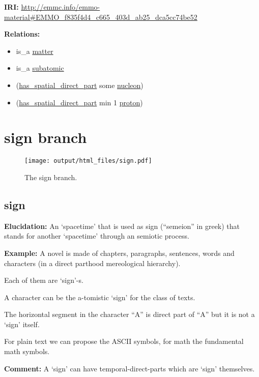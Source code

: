 \documentclass[a4paper,]{report}
\providecommand{\tightlist}{%
  \setlength{\itemsep}{0pt}\setlength{\parskip}{0pt}}
\begin{document}
\textbf{IRI:}
\url{http://emmc.info/emmo-material\#EMMO_f835f4d4_c665_403d_ab25_dca5cc74be52}

\textbf{Relations:}

\begin{itemize}
\tightlist
\item
  is\_a \protect\hyperlink{matter}{matter}
\item
  is\_a \protect\hyperlink{subatomic}{subatomic}
\item
  (\protect\hyperlink{has_spatial_direct_part}{has\_spatial\_direct\_part}
  some \protect\hyperlink{nucleon}{nucleon})
\item
  (\protect\hyperlink{has_spatial_direct_part}{has\_spatial\_direct\_part}
  min 1 \protect\hyperlink{proton}{proton})
\end{itemize}

\hypertarget{sign-branch}{%
\section{sign branch}\label{sign-branch}}

\begin{figure}
\centering
\texttt{[image: output/html\_files/sign.pdf]}
\caption{The sign branch.}
\end{figure}

\hypertarget{sign}{%
\subsection{sign}\label{sign}}

\textbf{Elucidation:} An `spacetime' that is used as sign (``semeion''
in greek) that stands for another `spacetime' through an semiotic
process.

\textbf{Example:} A novel is made of chapters, paragraphs, sentences,
words and characters (in a direct parthood mereological hierarchy).

Each of them are `sign'-s.

A character can be the a-tomistic `sign' for the class of texts.

The horizontal segment in the character ``A'' is direct part of ``A''
but it is not a `sign' itself.

For plain text we can propose the ASCII symbols, for math the
fundamental math symbols.

\textbf{Comment:} A `sign' can have temporal-direct-parts which are
`sign' themselves.
\end{document}
